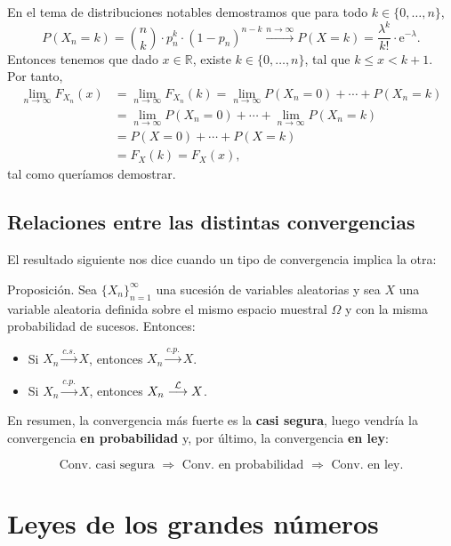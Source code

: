\documentclass[
  letterpaper,
  DIV=11,
  numbers=noendperiod]{scrreprt}
\begin{document}
En el tema de distribuciones notables demostramos que para todo
\(k\in\{0,\ldots,n\}\), \[
P(X_n = k)=\binom{n}{k}\cdot p_n^k\cdot (1-p_n)^{n-k}\stackrel{n\to\infty}{\longrightarrow} P(X=k)=\frac{\lambda^k}{k!}\cdot\mathrm{e}^{-\lambda}.
\] Entonces tenemos que dado \(x\in\mathbb{R}\), existe
\(k\in\{0,\ldots,n\}\), tal que \(k\leq x< k+1\). Por tanto, \[
\begin{array}{rl}
\lim\limits_{n\to\infty} F_{X_n}(x) 
& = \lim\limits_{n\to\infty} F_{X_n}(k)=\lim\limits_{n\to\infty} P(X_n=0)+\cdots + P(X_n=k) \\ 
& =\lim\limits_{n\to\infty} P(X_n=0)+\cdots + \lim\limits_{n\to\infty} P(X_n=k)\\
& = P(X=0)+\cdots + P(X=k)\\ &  =F_X(k)=F_X(x),
\end{array}
\] tal como queríamos demostrar.

\hypertarget{relaciones-entre-las-distintas-convergencias}{%
\subsection{Relaciones entre las distintas
convergencias}\label{relaciones-entre-las-distintas-convergencias}}

El resultado siguiente nos dice cuando un tipo de convergencia implica
la otra:

Proposición. Sea \(\{X_n\}_{n=1}^\infty\) una sucesión de variables
aleatorias y sea \(X\) una variable aleatoria definida sobre el mismo
espacio muestral \(\Omega\) y con la misma probabilidad de sucesos.
Entonces:

\begin{itemize}
\item
  Si \(X_n\stackrel{c.s.}{\longrightarrow} X\), entonces
  \(X_n\stackrel{c.p.}{\longrightarrow} X\).
\item
  Si \(X_n\stackrel{c.p.}{\longrightarrow} X\), entonces
  \(X_n\stackrel{{\cal L}}{\longrightarrow} X\).
\end{itemize}

En resumen, la convergencia más fuerte es la \textbf{casi segura}, luego
vendría la convergencia \textbf{en probabilidad} y, por último, la
convergencia \textbf{en ley}:

\[
\mbox{Conv. casi segura }\Rightarrow \mbox{ Conv. en probabilidad }\Rightarrow\mbox{ Conv. en ley.}
\]

\hypertarget{leyes-de-los-grandes-nuxfameros}{%
\section{Leyes de los grandes
números}\label{leyes-de-los-grandes-nuxfameros}}
\end{document}
